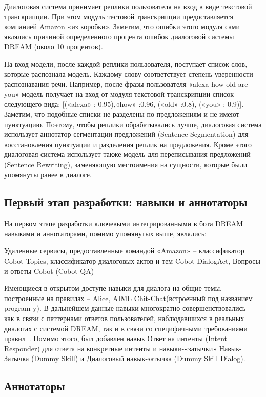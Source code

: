 Диалоговая система принимает реплики пользователя на вход в виде текстовой транскрипции. При этом модуль тестовой транскрипции предоставляется компанией Amazon «из коробки». Заметим, что ошибки этого модуля сами являлись причиной определенного процента ошибок диалоговой системы DREAM (около 10 процентов).

На вход модели, после каждой реплики пользователя, поступает список слов, которые распознала модель. Каждому слову соответствует степень уверенности распознавания речи. Например, после фразы пользователя «alexa how old are you» модель получает на вход от модуля текстовой транскрипции список следующего вида: [(«alexa» : 0.95),«how» :0.96, («old» :0.8), («you» : 0.9)]. Заметим, что подобные списки не разделены по предложениям и не имеют пунктуацию. Поэтому, чтобы реплики обрабатывались лучше, диалоговая система использует аннотатор сегментации предложений (Sentence Segmentation) для восстановления пунктуации и разделения реплик на предложения. Кроме этого диалоговая система использует также модель для переписывания предложений (Sentence Rewriting), заменяющую местоимения на сущности, которые были упомянуты ранее в диалоге.


\subsection{Первый этап разработки: навыки и аннотаторы}

На первом этапе разработки ключевыми интегрированными в бота {DREAM} навыками и аннотаторами, помимо упомянутых выше, являлись:

Удаленные сервисы, предоставленные командой «Amazon» --  классификатор Cobot Topics, классификатор диалоговых актов и тем Cobot DialogAct, Вопросы и ответы Cobot (Cobot QA)

Имеющиеся в открытом доступе навыки для диалога на общие темы, построенные на правилах -- Alice, AIML Chit-Chat(встроенный под названием program-y). В дальнейшем данные навыки многократно совершенствовались -- как в связи с паттернами ответов пользователей, наблюдавшихся в реальных диалогах с системой DREAM, так и в связи со специфичными требованиями правил~\cite{na_website_ndg}. Помимо этого, был добавлен навык Ответ на интенты (Intent Responder) для ответа на конкретные интенты и навыки-«затычки» Навык-Затычка (Dummy Skill) и Диалоговый навык-затычка (Dummy Skill Dialog).

\subsection{Аннотаторы}

